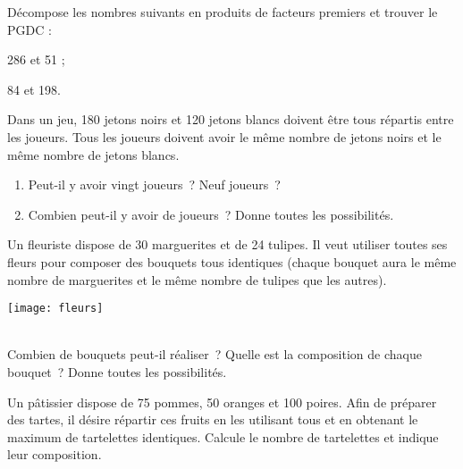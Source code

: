 \begin{exercice}
Décompose les nombres suivants en produits de facteurs premiers et trouver le PGDC :
\begin{colenumerate}{2}
 \item 286 et 51 ;
 \item 84 et 198.
 \end{colenumerate}
\end{exercice} 

\begin{exercice}
Dans un jeu, 180 jetons noirs et 120 jetons blancs doivent être tous répartis entre les joueurs. Tous les joueurs doivent avoir le même nombre de jetons noirs et le même nombre de jetons blancs.
\begin{enumerate}
 \item Peut-il y avoir vingt joueurs ? Neuf joueurs ?
 \item Combien peut-il y avoir de joueurs ? Donne toutes les possibilités.
 \end{enumerate}
\end{exercice} 

\begin{exercice}
\begin{minipage}[c]{0.66\linewidth}
Un fleuriste dispose de 30 marguerites et de 24 tulipes. Il veut utiliser toutes ses fleurs pour composer des bouquets tous identiques (chaque bouquet aura le même nombre de marguerites et le même nombre de tulipes que les autres).
 \end{minipage}\hfill%
 \begin{minipage}[c]{0.26\linewidth}
 \texttt{[image: fleurs]}
  \end{minipage} \\[1em]
 Combien de bouquets peut-il réaliser ? Quelle est la composition de chaque bouquet ? Donne toutes les possibilités.
\end{exercice} 

\begin{exercice}[Le pâtissier]
Un pâtissier dispose de 75 pommes, 50 oranges et 100 poires. Afin de préparer des tartes, il désire répartir ces fruits en les utilisant tous et en obtenant le maximum de tartelettes identiques. Calcule le nombre de tartelettes et indique leur composition.
\end{exercice}

